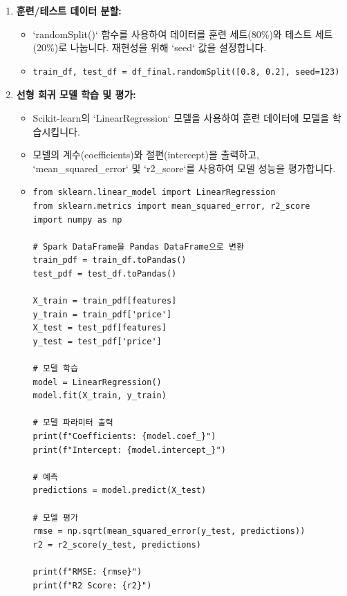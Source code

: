\documentclass[11pt,a4paper]{article}
\begin{document}
\begin{enumerate}
\begin{itemize}
\begin{lstlisting}[caption=특징 엔지니어링 코드]
# 최종 Spark DataFrame으로 변환
df_final = psdf_final.to_spark()
display(df_final)
        \end{lstlisting}
    \end{itemize}
    \item \textbf{훈련/테스트 데이터 분할:}
    \begin{itemize}
        \item `randomSplit()` 함수를 사용하여 데이터를 훈련 세트(80\%)와 테스트 세트(20\%)로 나눕니다. 재현성을 위해 `seed` 값을 설정합니다.
        \item \lstset{language=Python}
        \begin{lstlisting}[caption=훈련/테스트 데이터 분할 코드]
train_df, test_df = df_final.randomSplit([0.8, 0.2], seed=123)
        \end{lstlisting}
    \end{itemize}
    \item \textbf{선형 회귀 모델 학습 및 평가:}
    \begin{itemize}
        \item Scikit-learn의 `LinearRegression` 모델을 사용하여 훈련 데이터에 모델을 학습시킵니다.
        \item 모델의 계수(coefficients)와 절편(intercept)을 출력하고, `mean_squared_error` 및 `r2_score`를 사용하여 모델 성능을 평가합니다.
        \item \lstset{language=Python}
        \begin{lstlisting}[caption=선형 회귀 모델 학습 및 평가 코드]
from sklearn.linear_model import LinearRegression
from sklearn.metrics import mean_squared_error, r2_score
import numpy as np

# Spark DataFrame을 Pandas DataFrame으로 변환
train_pdf = train_df.toPandas()
test_pdf = test_df.toPandas()

X_train = train_pdf[features]
y_train = train_pdf['price']
X_test = test_pdf[features]
y_test = test_pdf['price']

# 모델 학습
model = LinearRegression()
model.fit(X_train, y_train)

# 모델 파라미터 출력
print(f"Coefficients: {model.coef_}")
print(f"Intercept: {model.intercept_}")

# 예측
predictions = model.predict(X_test)

# 모델 평가
rmse = np.sqrt(mean_squared_error(y_test, predictions))
r2 = r2_score(y_test, predictions)

print(f"RMSE: {rmse}")
print(f"R2 Score: {r2}")
        \end{lstlisting}
    \end{itemize}
\end{enumerate}
\end{document}
